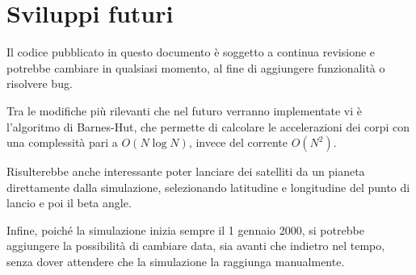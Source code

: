 \documentclass[11pt]{article}
\begin{document}
	\section{Sviluppi futuri}

	Il codice pubblicato in questo documento è soggetto a continua revisione e potrebbe cambiare in qualsiasi momento, al fine di aggiungere funzionalità o risolvere bug.

	Tra le modifiche più rilevanti che nel futuro verranno implementate vi è l'algoritmo di Barnes-Hut, che permette di calcolare le accelerazioni dei corpi con una complessità pari a $O(N\log{N})$, invece del corrente $O(N^2)$.

	Risulterebbe anche interessante poter lanciare dei satelliti da un pianeta direttamente dalla simulazione, selezionando latitudine e longitudine del punto di lancio e poi il beta angle.

	Infine, poiché la simulazione inizia sempre il 1 gennaio 2000, si potrebbe aggiungere la possibilità di cambiare data, sia avanti che indietro nel tempo, senza dover attendere che la simulazione la raggiunga manualmente.

	\printbibliography
\end{document}

